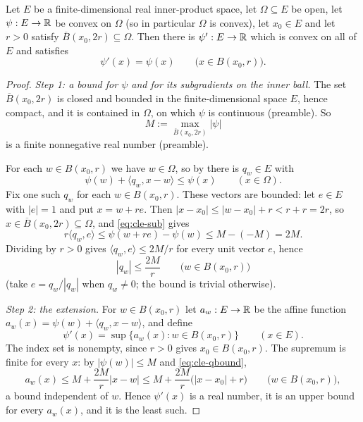 \begin{lemma}
Let $E$ be a finite-dimensional real inner-product space, let $\Omega\subseteq E$
be open, let $\psi:E\to\mathbb{R}$ be convex on $\Omega$ (so in particular $\Omega$ is
convex), let $x_0\in E$ and let $r>0$ satisfy
$\overline B(x_0,2r)\subseteq\Omega$. Then there is $\psi':E\to\mathbb{R}$ which is
convex on all of $E$ and satisfies
\[
  \psi'(x)=\psi(x)\qquad\bigl(x\in B(x_0,r)\bigr).
\]
\end{lemma}
\begin{proof}
\emph{Step 1: a bound for $\psi$ and for its subgradients on the inner ball.}
The set $\overline B(x_0,2r)$ is closed and bounded in the finite-dimensional
space $E$, hence compact, and it is contained in $\Omega$, on which $\psi$ is
continuous (preamble). So
\[
  M:=\max_{\overline B(x_0,2r)}|\psi|
\]
is a finite nonnegative real number (preamble).

For each $w\in B(x_0,r)$ we have $w\in\Omega$, so by
 there is $q_w\in E$ with
\begin{equation}\label{eq:cle-sub}
  \psi(w)+\langle q_w,x-w\rangle\le\psi(x)\qquad(x\in\Omega).
\end{equation}
Fix one such $q_w$ for each $w\in B(x_0,r)$. These vectors are bounded: let
$e\in E$ with $|e|=1$ and put $x=w+re$. Then
$|x-x_0|\le|w-x_0|+r<r+r=2r$, so $x\in\overline B(x_0,2r)\subseteq\Omega$, and
\eqref{eq:cle-sub} gives
\[
  r\langle q_w,e\rangle\le\psi(w+re)-\psi(w)\le M-(-M)=2M .
\]
Dividing by $r>0$ gives $\langle q_w,e\rangle\le2M/r$ for every unit vector $e$,
hence
\begin{equation}\label{eq:cle-qbound}
  |q_w|\le\frac{2M}{r}\qquad\bigl(w\in B(x_0,r)\bigr)
\end{equation}
(take $e=q_w/|q_w|$ when $q_w\ne0$; the bound is trivial otherwise).

\emph{Step 2: the extension.}
For $w\in B(x_0,r)$ let $a_w:E\to\mathbb{R}$ be the affine function
$a_w(x)=\psi(w)+\langle q_w,x-w\rangle$, and define
\[
  \psi'(x)=\sup\bigl\{a_w(x):w\in B(x_0,r)\bigr\}\qquad(x\in E).
\]
The index set is nonempty, since $r>0$ gives $x_0\in B(x_0,r)$. The supremum is
finite for every $x$: by $|\psi(w)|\le M$ and \eqref{eq:cle-qbound},
\[
  a_w(x)\le M+\frac{2M}{r}|x-w|\le M+\frac{2M}{r}\bigl(|x-x_0|+r\bigr)
  \qquad\bigl(w\in B(x_0,r)\bigr),
\]
a bound independent of $w$. Hence $\psi'(x)$ is a real number, it is an upper
bound for every $a_w(x)$, and it is the least such.


\end{proof}
